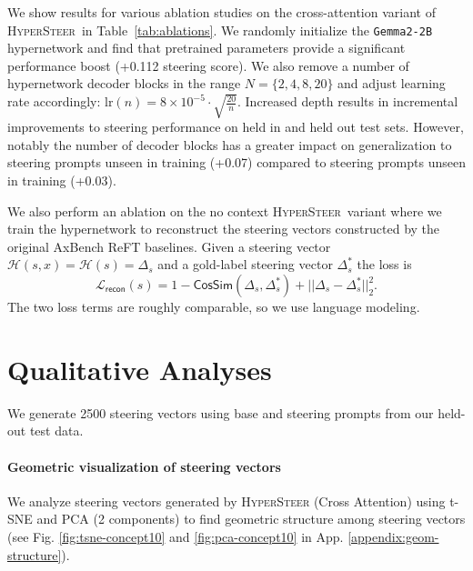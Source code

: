 \documentclass[11pt]{article}
\newcommand{\methodname}{\textsc{HyperSteer}}
\begin{document}
We show results for various ablation studies on the cross-attention variant of \methodname\ in Table~\ref{tab:ablations}.
We randomly initialize the \texttt{Gemma2-2B} hypernetwork and find that pretrained parameters provide a significant performance boost (+0.112 steering score). 
    We also remove a number of hypernetwork decoder blocks in the range $N=\{2,4,8,20\}$ and adjust learning rate accordingly: $\mathrm{lr}(n) = 8\times10^{-5} \cdot \sqrt{\frac{20}{n}}$. Increased depth results in incremental improvements to steering performance on held in and held out test sets. However, notably the number of decoder blocks has a greater impact on generalization to steering prompts unseen in training (+0.07) compared to steering prompts unseen in training  (+0.03).

We also perform an ablation on the no context \methodname\ variant where we train the hypernetwork to reconstruct the steering vectors constructed by the original AxBench ReFT baselines. Given a steering vector $\mathcal{H}(s,x) = \mathcal{H}(s) = \Delta_s$ and a gold-label steering vector $\Delta^*_s$ the loss is 
$$\mathcal{L}_{\textsf{recon}}(s) = 1-\mathsf{CosSim}(\Delta_s, \Delta^*_s) + ||\Delta_s - \Delta^*_s||_2^2.$$
The two loss terms are roughly comparable, so we use language modeling.

\section{Qualitative Analyses}
We generate 2500 steering vectors using base and steering prompts from our held-out test data.

\paragraph{Geometric visualization of steering vectors}
We analyze steering vectors generated by \methodname\; (Cross Attention) using t-SNE \cite{JMLR:v9:vandermaaten08a} and PCA (2 components) to find geometric structure among steering vectors (see Fig. \ref{fig:tsne-concept10} and \ref{fig:pca-concept10} in App. \ref{appendix:geom-structure}).
\end{document}
